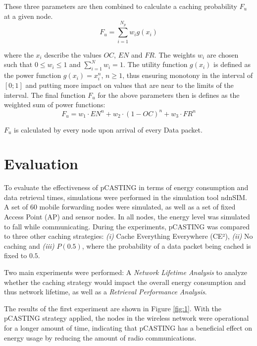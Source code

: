 \documentclass[conference]{IEEEtran}
\begin{document}
These three parameters are then combined to calculate a caching probability $F_u$ at a given node.
\begin{equation}
	F_u = \sum_{i = 1}^{N_p} w_i g(x_i)
\end{equation}

where the $x_i$ describe the values $OC$, $EN$ and $FR$. The weights $w_i$ are chosen such that $0 \leq w_i \leq 1$ and $\sum_{i = 1}^{N} w_i = 1$. The utility function $g(x_i)$ is defined as the power function $g(x_i) = x_i^n$, $n \geq 1$, thus ensuring monotony in the interval of $[0; 1]$ and putting more impact on values that are near to the limits of the interval. The final function $F_u$ for the above parameters then is defines as the weighted sum of power functions:
\begin{equation}
	F_u = w_1 \cdot EN^n + w_2 \cdot (1 - OC)^n + w_3 \cdot FR^n
\end{equation}

$F_u$ is calculated by every node upon arrival of every Data packet.

\section{Evaluation}
\label{sec:eval}

To evaluate the effectiveness of {pCASTING} in terms of energy consumption and data retrieval times, simulations were performed in the simulation tool {ndnSIM}. A set of 60 mobile forwarding nodes were simulated, as well as a set of fixed Access Point (AP) and sensor nodes. In all nodes, the energy level was simulated to fall while communicating. During the experiments, {pCASTING} was compared to three other caching strategies: \textit{(i)} Cache Everything Everywhere (CE²), \textit{(ii)} No caching and \textit{(iii)} $P(0.5)$, where the probability of a data packet being cached is fixed to $0.5$.

Two main experiments were performed: A \textit{Network Lifetime Analysis} to analyze whether the caching strategy would impact the overall energy consumption and thus network lifetime, as well as a \textit{Retrieval Performance Analysis}. 

The results of the first experiment are shown in Figure \ref{fig:1}. With the {pCASTING} strategy applied, the nodes in the wireless network were operational for a longer amount of time, indicating that {pCASTING} has a beneficial effect on energy usage by reducing the amount of radio communications.
\end{document}
